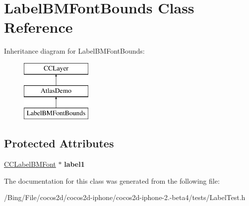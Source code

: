 \hypertarget{interface_label_b_m_font_bounds}{\section{Label\-B\-M\-Font\-Bounds Class Reference}
\label{interface_label_b_m_font_bounds}
}
Inheritance diagram for Label\-B\-M\-Font\-Bounds\-:\begin{figure}[H]
\begin{center}
\leavevmode
\includegraphics[height=3.000000cm]{interface_label_b_m_font_bounds}
\end{center}
\end{figure}
\subsection*{Protected Attributes}
\begin{DoxyCompactItemize}
\item 
\hypertarget{interface_label_b_m_font_bounds_a77912ed18e49c6fdd5afd58f81dc7411}{\hyperlink{interface_c_c_label_b_m_font}{C\-C\-Label\-B\-M\-Font} $\ast$ {\bfseries label1}}\label{interface_label_b_m_font_bounds_a77912ed18e49c6fdd5afd58f81dc7411}

\end{DoxyCompactItemize}


The documentation for this class was generated from the following file\-:\begin{DoxyCompactItemize}
\item 
/\-Bing/\-File/cocos2d/cocos2d-\/iphone/cocos2d-\/iphone-\/2.-\/beta4/tests/Label\-Test.\-h\end{DoxyCompactItemize}
